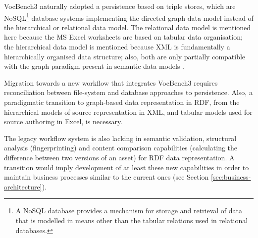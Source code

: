 	VocBench3 naturally adopted a persistence based on triple stores, which are NoSQL\footnote{A NoSQL database provides a mechanism for storage and retrieval of data that is modelled in means other than the tabular relations used in relational databases.} database systems implementing the directed graph data model instead of the hierarchical or relational data model. The relational data model is mentioned here because the MS Excel worksheets are based on tabular data organisation; the hierarchical data model is mentioned because XML is fundamentally a hierarchically organised data structure; also, both are only partially compatible with the graph paradigm present in semantic data models \citep{rdf-semantics}. 
	
	Migration towards a new workflow that integrates VocBench3 requires reconciliation between file-system and database approaches to persistence. Also, a paradigmatic transition to graph-based data representation in RDF, from the hierarchical models of source representation in XML, and tabular models used for source authoring in Excel, is necessary.
	 
	The legacy workflow system is also lacking in semantic validation, structural analysis (fingerprinting) and content comparison capabilities (calculating the difference between two versions of an asset) for RDF data representation. A transition would imply development of at least these new capabilities in order to maintain business processes similar to the current ones (see Section \ref{sec:business-architecture}). 
	